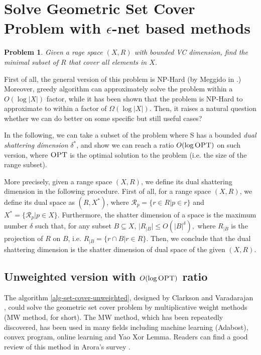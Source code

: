 \documentclass[11pt]{article}
\newcommand{\opt}{\textrm{\sc OPT}}
\newtheorem{problem}{Problem}
\renewcommand{\R}{\mathcal{R}}
\begin{document}
\section{Solve Geometric Set Cover Problem with $\epsilon$-net based methods  }

\begin{problem}
Given a rage space $(X,R)$ with bounded VC dimension, find the minimal subset 
	of $R$ that cover all elements in $X$.
\end{problem}	

First of all, the general version of this problem is NP-Hard (by Meggido in \cite{megiddo1984complexity}.)
Moreover, greedy algorithm can approximately solve the problem within a $O(\log |X|)$ factor,
	 while it has been shown that the problem is NP-Hard to approximate to within a factor of $\Omega(\log |X|)$. 
Then, it raises a natural question whether we can do better on some specific but still useful cases?  

In the following, we can take a subset of the problem where S has a bounded \textit{dual shattering dimension} $\delta^*$,
	and show we can reach a ratio $O(\log \opt)$ on such version, where $\opt$ is the optimal solution to the problem 
	(i.e. the size of the range subset). 

More precisely, given a range space $(X,R)$, we define its dual shattering dimension in the following procedure. 
First of all, for a range space $(X,R)$, we define its dual space as $(R,X^*)$,
	where $\R_p=\{r\in R| p\in r\}$ and $X^*=\{\R_p| p\in X\}$.
Furthermore, the shatter dimension of a space  is the maximum number $\delta$ such that, 
	for any subset $B\subseteq X$,
	$ \big|R_{|B}\big|\leq O(|B|^\delta),$
where $R_{|B}$ is the projection of $R$ on $B$, i.e. $R_{|B}=\{r\cap B| r\in R\}$. 
Then, we conclude that  the dual shattering dimension is the shatter dimension  of dual space 
	of the given $(X,R)$.
 	


\subsection{Unweighted version with $O(\log \opt)$ ratio}
The algorithm \ref{alg-set-cover-unweighted}, designed by Clarkson and Varadarajan \cite{clarkson2007improved}, could
	solve the geometric set cover problem by multiplicative weight methods (MW method, for short). 
The MW method, which has been repeatedly discovered, has been used in many fields 
	including machine learning (Adabost), convex program, online learning and Yao Xor Lemma.
Readers can find a good review of this method in Arora's survey \cite{arora2012multiplicative}.
	
\end{document}
